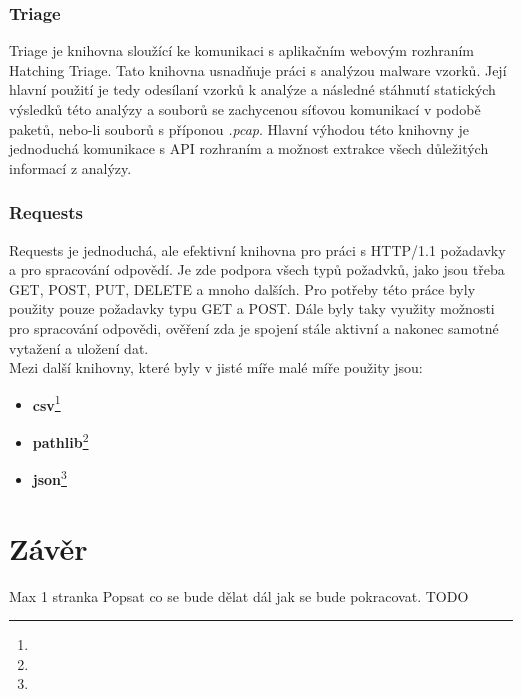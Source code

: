 \subsection*{Triage}
Triage je knihovna sloužící ke komunikaci s aplikačním webovým rozhraním Hatching Triage. Tato knihovna usnadňuje práci s analýzou malware vzorků.
Její hlavní použití je tedy odesílaní vzorků k analýze a následné stáhnutí statických výsledků této analýzy a souborů se zachycenou síťovou komunikací v 
podobě paketů, nebo-li souborů s příponou \textit{.pcap}. Hlavní výhodou této knihovny je jednoduchá komunikace s API rozhraním a možnost extrakce všech důležitých
informací z analýzy.

\subsection*{Requests}
Requests je jednoduchá, ale efektivní knihovna pro práci s HTTP/1.1 požadavky a pro spracování odpovědí. Je zde podpora všech typů požadvků, jako jsou
třeba GET, POST, PUT, DELETE a mnoho dalších. Pro potřeby této práce byly použity pouze požadavky typu GET a POST. Dále byly taky využity možnosti
pro spracování odpovědi, ověření zda je spojení stále aktivní a nakonec samotné vytažení a uložení dat.\\ 

Mezi další knihovny, které byly v jisté míře malé míře použity jsou:
\begin{itemize}
    \item \textbf{csv}\footnote{}
    \item \textbf{pathlib}\footnote{}
    \item \textbf{json}\footnote{}
\end{itemize}



    
\chapter{Závěr}
Max 1 stranka \cite{Pysny}
Popsat co se bude dělat dál jak se bude pokracovat.
TODO




%
